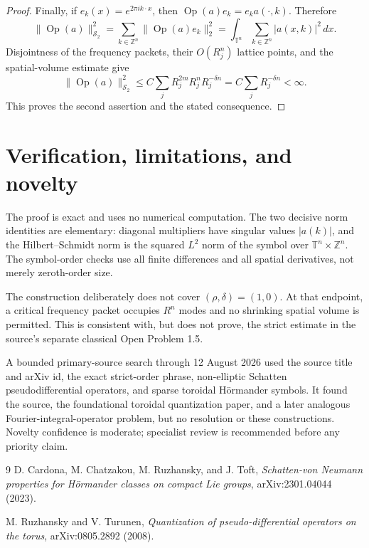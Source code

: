 \documentclass[11pt]{article}
\theoremstyle{remark}
\newcommand{\T}{\mathbb T}
\newcommand{\Z}{\mathbb Z}
\newcommand{\Schatten}{\mathscr S}
\newcommand{\Op}{\operatorname{Op}}
\begin{document}
\begin{proof}
Finally, if \(e_k(x)=e^{2\pi i k\cdot x}\), then
\(\Op(a)e_k=e_k a(\cdot,k)\). Therefore
\[
 \|\Op(a)\|_{\Schatten_2}^2
 =\sum_{k\in\Z^n}\|\Op(a)e_k\|_2^2
 =\int_{\T^n}\sum_{k\in\Z^n}|a(x,k)|^2\,dx.
\]
Disjointness of the frequency packets, their \(O(R_j^n)\) lattice points,
and the spatial-volume estimate give
\[
 \|\Op(a)\|_{\Schatten_2}^2
 \le C\sum_j R_j^{2m}R_j^nR_j^{-\delta n}
 =C\sum_jR_j^{-\delta n}<\infty.
\]
This proves the second assertion and the stated consequence.
\end{proof}

\section{Verification, limitations, and novelty}

The proof is exact and uses no numerical computation. The two decisive norm
identities are elementary: diagonal multipliers have singular values
\(|a(k)|\), and the Hilbert--Schmidt norm is the squared \(L^2\) norm of the
symbol over \(\T^n\times\Z^n\). The symbol-order checks use all finite
differences and all spatial derivatives, not merely zeroth-order size.

The construction deliberately does not cover \((\rho,\delta)=(1,0)\). At that
endpoint, a critical frequency packet occupies \(R^n\) modes and no shrinking
spatial volume is permitted. This is consistent with, but does not prove, the
strict estimate in the source's separate classical Open Problem 1.5.

A bounded primary-source search through 12 August 2026 used the source title
and arXiv id, the exact strict-order phrase, non-elliptic Schatten
pseudodifferential operators, and sparse toroidal H\"ormander symbols. It found
the source, the foundational toroidal quantization paper, and a later analogous
Fourier-integral-operator problem, but no resolution or these constructions.
Novelty confidence is moderate; specialist review is recommended before any
priority claim.

\begin{thebibliography}{9}
D. Cardona, M. Chatzakou, M. Ruzhansky, and J. Toft,
\emph{Schatten-von Neumann properties for H\"ormander classes on compact Lie
groups}, arXiv:2301.04044 (2023).

M. Ruzhansky and V. Turunen,
\emph{Quantization of pseudo-differential operators on the torus},
arXiv:0805.2892 (2008).
\end{thebibliography}
\end{document}
